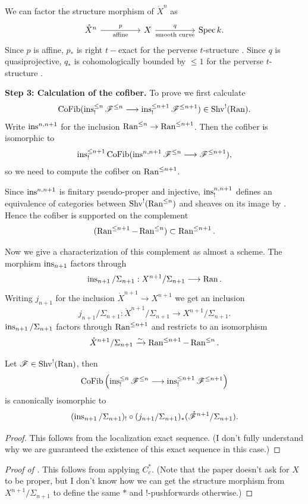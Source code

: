 \documentclass[oneside]{amsart}
\begin{document}
We can factor the structure morphism of $\mathring{X}^{n}$ as
\[
\begin{tikzcd}[column sep=huge]
	\mathring{X}^{n} \ar[r,"p","\text{affine}"'] & X \ar[r,"q","\text{smooth curve}"'] & \Spec k.
\end{tikzcd}
\] 
Since $p$ is affine, $p_*$ is right $t-$exact for the perverse $t$-structure \cite[Theorem~4.1.1]{BBD}. Since $q$ is quasiprojective, $q_*$ is cohomologically bounded by $\le 1$ for the perverse $t$-structure \cite[4.2.4]{BBD}.

\textbf{Step 3: Calculation of the cofiber.}
To prove  we first calculate
\[
	\CoFib(\ins^{\le n}_!\CF^{\le n}\to \ins^{\le n+1}_!\CF^{\le n+1})\in \Shv^{!}(\Ran).
\] 
Write $\operatorname{ins}^{n,n+1}$ for the inclusion $\Ran^{\le n}\to \Ran^{\le n+1}$. Then the cofiber is isomorphic to
\[
\ins^{\le n+1}_! \CoFib(\ins^{n,n+1}\CF^{\le n}\to \CF^{\le n+1}),
\] 
so we need to compute the cofiber on $\operatorname{Ran}^{\le n+1}$.

Since $\operatorname{ins}^{n,n+1}$ is finitary pseudo-proper and injective, $\operatorname{ins}^{n,n+1}_!$ defines an equivalence of categories between $\operatorname{Shv}^{!}(\operatorname{Ran}^{\le n})$ and sheaves on its image by \cite[Lemma~7.4.11(d)]{abott}. Hence the cofiber is supported on the complement
\[
	(\operatorname{Ran}^{\le n+1}-\operatorname{Ran}^{\le n})\subset \operatorname{Ran}^{\le n+1}.
\] 

Now we give a characterization of this complement as almost a scheme. The morphism $\operatorname{ins}_{n+1}$ factors through
\[
	\ins_{n+1} /\Sigma_{n+1}:X^{n+1} /\Sigma_{n+1} \to \Ran.
\] 
Writing $j_{n+1}$ for the inclusion $\mathring{X}^{n+1}\to X^{n+1}$ we get an inclusion
\[
	j_{n+1} /\Sigma_{n+1}:\mathring{X}^{n+1} /\Sigma_{n+1} \to X^{n+1} /\Sigma_{n+1}.
\] 
$\operatorname{ins}_{n+1} /\Sigma_{n+1}$ factors through $\operatorname{Ran}^{\le n+1}$ and restricts to an isomorphism
\[
	\mathring{X}^{n+1}/\Sigma_{n+1} \xrightarrow{\sim} \operatorname{Ran}^{\le n+1} - \operatorname{Ran}^{\le n}.
\] 

\begin{lemma}\label{lmm:cofib}
	Let $\mathscr{F}\in \operatorname{Shv}^{!}(\operatorname{Ran})$, then
	\[
	\CoFib\left( \ins_!^{\le n}\CF^{\le n} \to \ins_!^{\le n+1}\CF^{\le n+1} \right) 
	\] 
	is canonically isomorphic to
	\[
		(\operatorname{ins}_{n+1} /\Sigma_{n+1})_! \circ (j_{n+1} /\Sigma_{n+1})_* (\mathring{\mathscr{F}}^{n+1} /\Sigma_{n+1}).
	\] 
\end{lemma}
\begin{proof}
	This follows from the localization exact sequence. (I don't fully understand why we are guaranteed the existence of this exact sequence in this case.)
\end{proof}
\begin{proof}[Proof of ]
	This follows from applying $C^{*}_c$. (Note that the paper doesn't ask for $X$ to be proper, but I don't know how we can get the structure morphism from $X^{n+1} /\Sigma_{n+1}$ to define the same $*$ and $!$-pushforwards otherwise.)
\end{proof}
\end{document}
